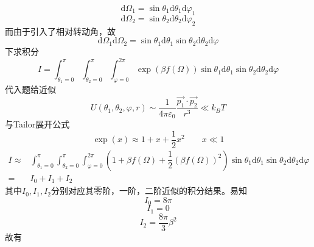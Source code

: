 \documentclass{article}
\begin{document}
\begin{itemize}
\begin{equation}
        \mathrm{d}\Omega_1=\sin\theta_1 \mathrm{d}\theta_1 \mathrm{d} \varphi_1
    \end{equation}
    \begin{equation}
        \mathrm{d}\Omega_2=\sin\theta_2 \mathrm{d}\theta_2 \mathrm{d} \varphi_2
    \end{equation}
    而由于引入了相对转动角，故
    \begin{equation}
        \mathrm{d}\Omega_1\mathrm{d}\Omega_2=\sin\theta_1 \mathrm{d}\theta_1\sin\theta_2 \mathrm{d}\theta_2 \mathrm{d} \varphi
    \end{equation}
    下求积分
    \begin{equation}
        I=
        \displaystyle\int_{\theta_1=0}^{\pi} \displaystyle\int_{\theta_2=0}^{\pi}\displaystyle\int_{\varphi=0}^{2\pi}
        \exp(\beta f(\Omega))\sin \theta_1 \mathrm{d} \theta_1\sin \theta_2 \mathrm{d} \theta_2  \mathrm{d} \varphi
    \end{equation}   
    代入题给近似
    \begin{equation}
        U(\theta_1,\theta_2,\varphi,r) \sim \dfrac{1}{4\pi\varepsilon_0}\dfrac{\overrightarrow{p_1}\cdot\overrightarrow{p_2}}{r^3}\ll k_B T
    \end{equation}
    与Tailor展开公式
    \begin{equation}
        \exp(x)\approx 1+x+\dfrac{1}{2}x^2\qquad x\ll1
    \end{equation}
    \begin{equation}
        \begin{aligned}
        I\approx&
        \displaystyle\int_{\theta_1=0}^{\pi} \displaystyle\int_{\theta_2=0}^{\pi}\displaystyle\int_{\varphi=0}^{2\pi}
        \left(1+\beta f(\Omega)+\dfrac{1}{2}\left(\beta f(\Omega)\right)^2\right)\sin \theta_1 \mathrm{d} \theta_1\sin \theta_2 \mathrm{d} \theta_2  \mathrm{d} \varphi\\
        =&I_0+I_1+I_2            
        \end{aligned}
    \end{equation}  
    其中$I_0,I_1,I_2$分别对应其零阶，一阶，二阶近似的积分结果。易知
    \begin{equation}
        I_0=8\pi
    \end{equation}
    \begin{equation}
        I_1=0
    \end{equation}
    \begin{equation}
        I_2=\dfrac{8\pi}{3}\beta^2
    \end{equation}
    故有

\end{itemize}
\end{document}
